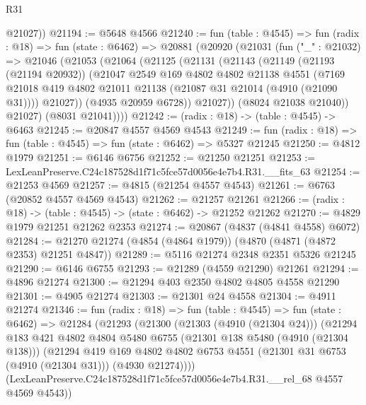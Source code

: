 \begin{lexlean}{R31}
\begin{coremodule}
        @21027))
@21194 := @5648 @4566
@21240 := fun (table : @4545) =>
  fun (radix : @18) =>
  fun (state : @6462) =>
  @20881
    (@20920
      (@21031
        (fun ("_" : @21032) =>
        @21046
          (@21053
            (@21064
              (@21125
                (@21131
                  (@21143
                    (@21149
                      (@21193 (@21194 @20932))
                      (@21047
                        @2549
                        @169
                        @4802
                        @4802
                        @21138
                        @4551
                        (@7169
                          @21018
                          @419
                          @4802
                          @21011
                          @21138
                          (@21087 @31 @21014 (@4910 (@21090 @31))))
                        @21027))
                    (@4935 @20959 @6728))
                  @21027))
              (@8024 @21038 @21040))
            @21027)
          (@8031 @21041))))
@21242 := (radix : @18) -> (table : @4545) -> @6463
@21245 := @20847 @4557 @4569 @4543
@21249 := fun (radix : @18) => fun (table : @4545) => fun (state : @6462) => @5327 @21245
@21250 := @4812 @1979
@21251 := @6146 @6756
@21252 := @21250 @21251
@21253 := LexLeanPreserve.C24c187528d1f71c5fce57d0056e4e7b4.R31.__fits_63
@21254 := @21253 @4569
@21257 := @4815 (@21254 @4557 @4543)
@21261 := @6763 (@20852 @4557 @4569 @4543)
@21262 := @21257 @21261
@21266 := (radix : @18) -> (table : @4545) -> (state : @6462) -> @21252 @21262
@21270 := @4829 @1979 @21251 @21262 @2353
@21274 := @20867 (@4837 (@4841 @4558) @6072)
@21284 := @21270 @21274 (@4854 (@4864 @1979)) (@4870 (@4871 (@4872 @2353) @21251 @4847))
@21289 := @5116 @21274 @2348 @2351 @5326 @21245
@21290 := @6146 @6755
@21293 := @21289 (@4559 @21290) @21261
@21294 := @4896 @21274
@21300 := @21294 @403 @2350 @4802 @4805 @4558 @21290
@21301 := @4905 @21274
@21303 := @21301 @24 @4558
@21304 := @4911 @21274
@21346 := fun (radix : @18) =>
  fun (table : @4545) =>
  fun (state : @6462) =>
  @21284
    (@21293
      (@21300
        (@21303 (@4910 (@21304 @24)))
        (@21294
          @183
          @421
          @4802
          @4804
          @5480
          @6755
          (@21301 @138 @5480 (@4910 (@21304 @138)))
          (@21294
            @419
            @169
            @4802
            @4802
            @6753
            @4551
            (@21301 @31 @6753 (@4910 (@21304 @31)))
            (@4930 @21274))))
      (LexLeanPreserve.C24c187528d1f71c5fce57d0056e4e7b4.R31.__rel_68 @4557 @4569 @4543))

\end{coremodule}
\end{lexlean}
